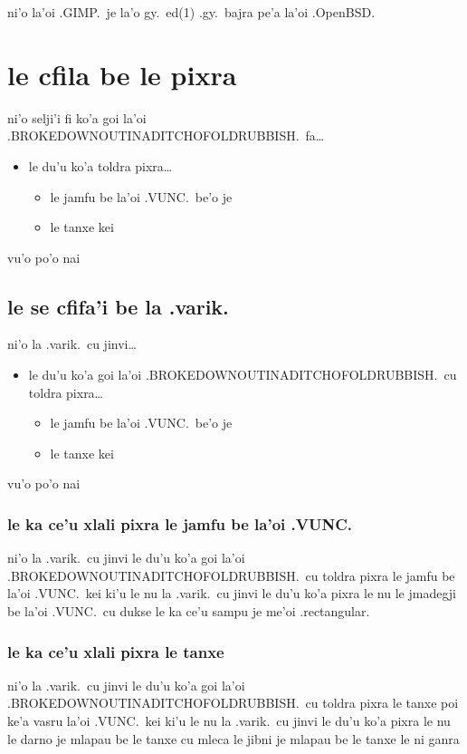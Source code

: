 \documentclass{report}
\begin{document}
ni'o la'oi .GIMP.\ je la'o gy.\ ed(1) .gy.\ bajra pe'a la'oi .OpenBSD.

\section{le cfila be le pixra}
ni'o selji'i fi ko'a goi la'oi .BROKEDOWNOUTINADITCHOFOLDRUBBISH.\ fa\ldots
\begin{itemize}
	\item le du'u ko'a toldra pixra\ldots
	\begin{itemize}
		\item le jamfu be la'oi .VUNC.\ be'o je
		\item le tanxe kei
	\end{itemize}
\end{itemize}
vu'o po'o nai

\subsection{le se cfifa'i be la .varik.}
ni'o la .varik.\ cu jinvi\ldots
\begin{itemize}
	\item le du'u ko'a goi la'oi .BROKEDOWNOUTINADITCHOFOLDRUBBISH.\ cu toldra pixra\ldots
	\begin{itemize}
		\item le jamfu be la'oi .VUNC.\ be'o je
		\item le tanxe kei
	\end{itemize}
\end{itemize}
vu'o po'o nai

\subsubsection{le ka ce'u xlali pixra le jamfu be la'oi .VUNC.}
ni'o la .varik.\ cu jinvi le du'u ko'a goi la'oi .BROKEDOWNOUTINADITCHOFOLDRUBBISH.\ cu toldra pixra le jamfu be la'oi .VUNC.\ kei ki'u le nu la .varik.\ cu jinvi le du'u ko'a pixra le nu le jmadegji be la'oi .VUNC.\ cu dukse le ka ce'u sampu je me'oi .rectangular.

\subsubsection{le ka ce'u xlali pixra le tanxe}
ni'o la .varik.\ cu jinvi le du'u ko'a goi la'oi .BROKEDOWNOUTINADITCHOFOLDRUBBISH.\ cu toldra pixra le tanxe poi ke'a vasru la'oi .VUNC.\ kei ki'u le nu la .varik.\ cu jinvi le du'u ko'a pixra le nu le darno je mlapau be le tanxe cu mleca le jibni je mlapau be le tanxe le ni ganra
\end{document}
